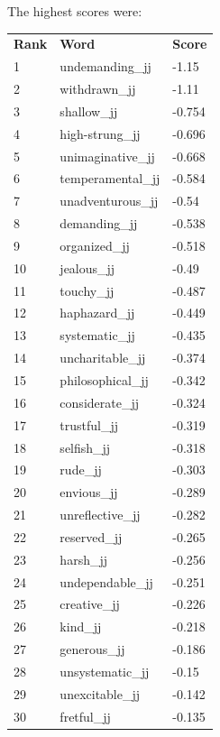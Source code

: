 \documentclass[10pt,letterpaper]{book}
\begin{document}
The highest scores were:
\begin{tabular}{ l l l }
        \textbf{Rank} & \textbf{Word} & \textbf{Score} \\
        1 & undemanding\_jj & -1.15 \\
        2 & withdrawn\_jj & -1.11 \\
        3 & shallow\_jj & -0.754 \\
        4 & high-strung\_jj & -0.696 \\
        5 & unimaginative\_jj & -0.668 \\
        6 & temperamental\_jj & -0.584 \\
        7 & unadventurous\_jj & -0.54 \\
        8 & demanding\_jj & -0.538 \\
        9 & organized\_jj & -0.518 \\
        10 & jealous\_jj & -0.49 \\
        11 & touchy\_jj & -0.487 \\
        12 & haphazard\_jj & -0.449 \\
        13 & systematic\_jj & -0.435 \\
        14 & uncharitable\_jj & -0.374 \\
        15 & philosophical\_jj & -0.342 \\
        16 & considerate\_jj & -0.324 \\
        17 & trustful\_jj & -0.319 \\
        18 & selfish\_jj & -0.318 \\
        19 & rude\_jj & -0.303 \\
        20 & envious\_jj & -0.289 \\
        21 & unreflective\_jj & -0.282 \\
        22 & reserved\_jj & -0.265 \\
        23 & harsh\_jj & -0.256 \\
        24 & undependable\_jj & -0.251 \\
        25 & creative\_jj & -0.226 \\
        26 & kind\_jj & -0.218 \\
        27 & generous\_jj & -0.186 \\
        28 & unsystematic\_jj & -0.15 \\
        29 & unexcitable\_jj & -0.142 \\
        30 & fretful\_jj & -0.135 \\
\end{tabular}
\end{document}
